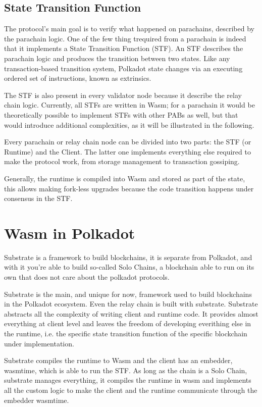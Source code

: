 \subsection{State Transition Function}

The protocol's main goal is to verify what happened on parachains, described by the parachain logic. One of the few  thing trequired from a parachain is indeed that it implements a State Transition Function (STF). An STF describes the parachain logic and produces the transition between two states. Like any transaction-based transition system, Polkadot state changes via an executing ordered set of instructions, known as extrinsics.~\cite{burdges2020overview}

The STF is also present in every validator node because it describe the relay chain logic. Currently, all STFs are written in Wasm; for a parachain it would be theoretically possible to implement STFs with other PABs as well, but that would introduce additional complexities, as it will be illustrated in the following.

Every parachain or relay chain node can be divided into two parts: the STF (or Runtime) and the Client. The latter one implements everything else required to make the protocol work, from storage management to transaction gossiping.

Generally, the runtime is compiled into Wasm and stored as part of the state, this allows making fork-less upgrades because the code transition happens under consensus in the STF.

\section{Wasm in Polkadot}

Substrate is a framework to build blockchains, it is separate from Polkadot, and with it you're able to build so-called Solo Chains, a blockchain able to run on its own that does not care about the polkadot protocols.

Substrate is the main, and unique for now, framework used to build blockchains in the Polkadot ecosystem. Even the relay chain is built with substrate. Substrate abstracts all the complexity of writing client and runtime code. It provides almost everything at client level and leaves  the freedom of developing everithing else in the runtime, i.e. the specific state transition function of the specific blockchain under implementation.

Substrate compiles the runtime to Wasm and the client has an embedder, wasmtime, which is able to run the STF. As long as the chain is a Solo Chain, substrate manages everything, it compiles the runtime in wasm and implements all the custom logic to make the client and the runtime communicate through the embedder wasmtime.

